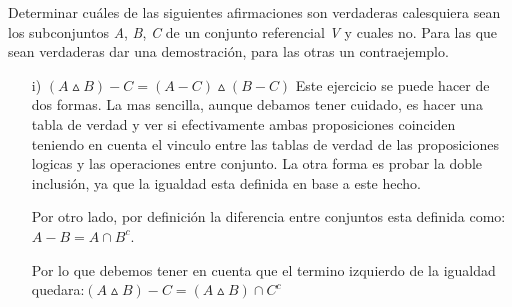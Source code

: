 \documentclass[10pt]{article}
\begin{document}
\begin{ej}
 Determinar cuáles  de las siguientes afirmaciones  son verdaderas  calesquiera sean los subconjuntos \textit{A}, \textit{B}, \textit{C} de un conjunto referencial \textit{V} y cuales no. Para las que sean verdaderas dar una demostración, para las otras un contraejemplo.   
\begin{itemize}
	\item[i)] $(A \vartriangle B) - C = (A - C) \vartriangle (B - C)$
	Este ejercicio se puede hacer de dos formas. La mas sencilla, aunque debamos tener cuidado, es hacer una tabla de verdad y ver si efectivamente ambas proposiciones coinciden teniendo en cuenta el vinculo entre las tablas de verdad de las proposiciones logicas y las operaciones entre conjunto. La otra forma es probar la doble inclusión, ya que la igualdad esta definida en base a este hecho.
	
	Por otro lado, por definición la diferencia entre conjuntos esta definida como:  $A -B = A \cap B^c$. 
	
	Por lo que debemos tener en cuenta que el termino izquierdo de la igualdad quedara:$ (A \vartriangle B) - C = (A \vartriangle B) \cap C^c$ 
	

\end{itemize}
\end{ej}
\end{document}
